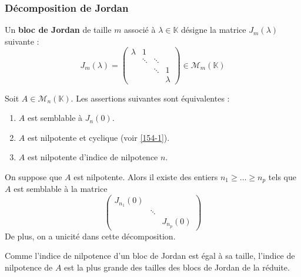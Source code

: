   \subsubsection{Décomposition de Jordan}
  
  
  \begin{definition}
    Un \textbf{bloc de Jordan} de taille $m$ associé à $\lambda \in \mathbb{K}$ désigne la matrice $J_m(\lambda)$ suivante :
    \[ J_m(\lambda) = \begin{pmatrix} \lambda & 1 & \\ & \ddots & \ddots & \\ & & \ddots & 1 \\ & & & \lambda \end{pmatrix} \in \mathcal{M}_m(\mathbb{K}) \]
  \end{definition}
  
  \begin{proposition}
    Soit $A \in \mathcal{M}_n(\mathbb{K})$. Les assertions suivantes sont équivalentes :
    \begin{enumerate}[label=(\roman*)]
      \item $A$ est semblable à $J_n(0)$.
      \item $A$ est nilpotente et cyclique (voir \cref{154-1}).
      \item $A$ est nilpotente d'indice de nilpotence $n$.
    \end{enumerate}
  \end{proposition}
  
  \begin{theorem}
    On suppose que $A$ est nilpotente. Alors il existe des entiers $n_1 \geq \dots \geq n_p$ tels que $A$ est semblable à la matrice
    \[ \begin{pmatrix} J_{n_1}(0) & & \\ & \ddots & \\ & & J_{n_p}(0) \end{pmatrix} \]
    De plus, on a unicité dans cette décomposition.
  \end{theorem}
  
  \begin{remark}
    Comme l'indice de nilpotence d'un bloc de Jordan est égal à sa taille, l'indice de nilpotence de $A$ est la plus grande des tailles des blocs de Jordan de la réduite.
  \end{remark}
  
  
